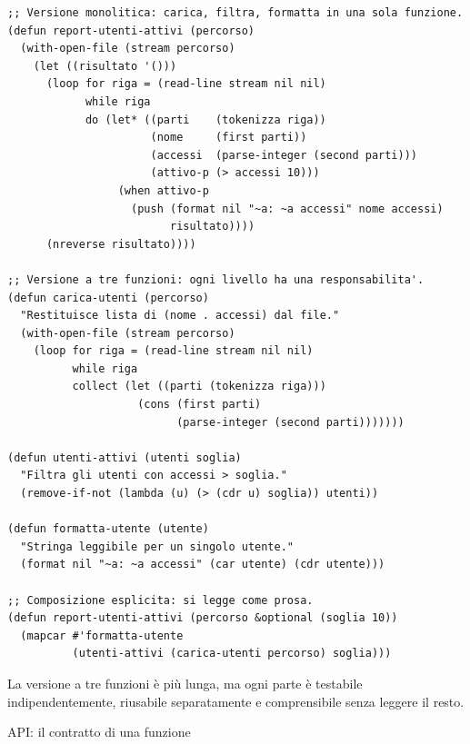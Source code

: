 \begin{esempio}
\begin{lstlisting}
;; Versione monolitica: carica, filtra, formatta in una sola funzione.
(defun report-utenti-attivi (percorso)
  (with-open-file (stream percorso)
    (let ((risultato '()))
      (loop for riga = (read-line stream nil nil)
            while riga
            do (let* ((parti    (tokenizza riga))
                      (nome     (first parti))
                      (accessi  (parse-integer (second parti)))
                      (attivo-p (> accessi 10)))
                 (when attivo-p
                   (push (format nil "~a: ~a accessi" nome accessi)
                         risultato))))
      (nreverse risultato))))

;; Versione a tre funzioni: ogni livello ha una responsabilita'.
(defun carica-utenti (percorso)
  "Restituisce lista di (nome . accessi) dal file."
  (with-open-file (stream percorso)
    (loop for riga = (read-line stream nil nil)
          while riga
          collect (let ((parti (tokenizza riga)))
                    (cons (first parti)
                          (parse-integer (second parti)))))))

(defun utenti-attivi (utenti soglia)
  "Filtra gli utenti con accessi > soglia."
  (remove-if-not (lambda (u) (> (cdr u) soglia)) utenti))

(defun formatta-utente (utente)
  "Stringa leggibile per un singolo utente."
  (format nil "~a: ~a accessi" (car utente) (cdr utente)))

;; Composizione esplicita: si legge come prosa.
(defun report-utenti-attivi (percorso &optional (soglia 10))
  (mapcar #'formatta-utente
          (utenti-attivi (carica-utenti percorso) soglia)))
\end{lstlisting}
\end{esempio}

La versione a tre funzioni è più lunga, ma ogni parte
è testabile indipendentemente, riusabile separatamente
e comprensibile senza leggere il resto.

\begin{concetto}{API: il contratto di una funzione}
\end{concetto}

